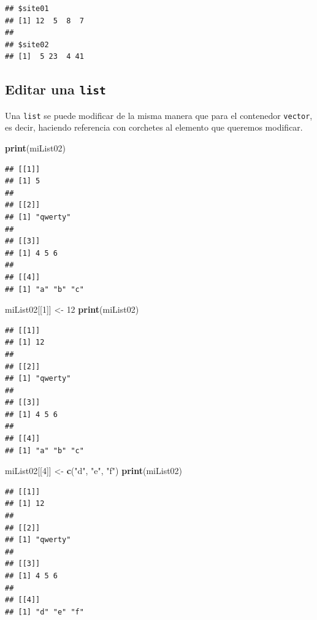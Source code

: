 \documentclass[]{book}
\newenvironment{Shaded}{\begin{snugshade}}{\end{snugshade}}
\newcommand{\KeywordTok}[1]{\textcolor[rgb]{0.13,0.29,0.53}{\textbf{#1}}}
\newcommand{\DecValTok}[1]{\textcolor[rgb]{0.00,0.00,0.81}{#1}}
\newcommand{\StringTok}[1]{\textcolor[rgb]{0.31,0.60,0.02}{#1}}
\newcommand{\NormalTok}[1]{#1}
\begin{document}
\begin{verbatim}
## $site01
## [1] 12  5  8  7
## 
## $site02
## [1]  5 23  4 41
\end{verbatim}

\subsection{\texorpdfstring{Editar una
\texttt{list}}{Editar una list}}\label{editar-una-list}

Una \texttt{list} se puede modificar de la misma manera que para el
contenedor \texttt{vector}, es decir, haciendo referencia con corchetes
al elemento que queremos modificar.

\begin{Shaded}
\begin{Highlighting}[]
\KeywordTok{print}\NormalTok{(miList02)}
\end{Highlighting}
\end{Shaded}

\begin{verbatim}
## [[1]]
## [1] 5
## 
## [[2]]
## [1] "qwerty"
## 
## [[3]]
## [1] 4 5 6
## 
## [[4]]
## [1] "a" "b" "c"
\end{verbatim}

\begin{Shaded}
\begin{Highlighting}[]
\NormalTok{miList02[[}\DecValTok{1}\NormalTok{]] <-}\StringTok{ }\DecValTok{12}
\KeywordTok{print}\NormalTok{(miList02)}
\end{Highlighting}
\end{Shaded}

\begin{verbatim}
## [[1]]
## [1] 12
## 
## [[2]]
## [1] "qwerty"
## 
## [[3]]
## [1] 4 5 6
## 
## [[4]]
## [1] "a" "b" "c"
\end{verbatim}

\begin{Shaded}
\begin{Highlighting}[]
\NormalTok{miList02[[}\DecValTok{4}\NormalTok{]] <-}\StringTok{ }\KeywordTok{c}\NormalTok{(}\StringTok{"d"}\NormalTok{, }\StringTok{"e"}\NormalTok{, }\StringTok{"f"}\NormalTok{)}
\KeywordTok{print}\NormalTok{(miList02)}
\end{Highlighting}
\end{Shaded}

\begin{verbatim}
## [[1]]
## [1] 12
## 
## [[2]]
## [1] "qwerty"
## 
## [[3]]
## [1] 4 5 6
## 
## [[4]]
## [1] "d" "e" "f"
\end{verbatim}
\end{document}
